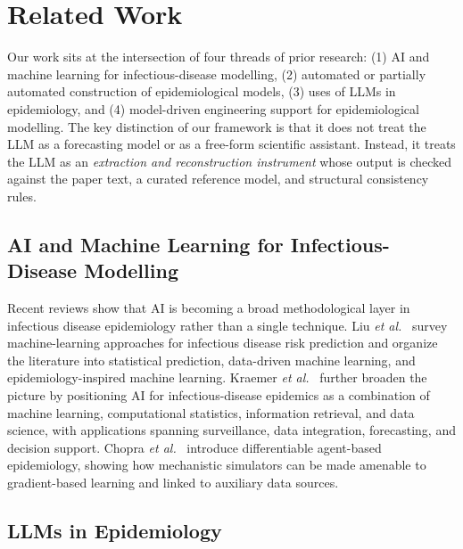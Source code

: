 \section{Related Work}
\label{sec:related}

Our work sits at the intersection of four threads of prior research: (1) AI and machine
learning for infectious-disease modelling, (2) automated or partially automated construction
of epidemiological models, (3) uses of LLMs in epidemiology, and (4) model-driven
engineering support for epidemiological modelling. The key distinction of our framework is
that it does not treat the LLM as a forecasting model or as a free-form scientific assistant.
Instead, it treats the LLM as an \emph{extraction and reconstruction instrument} whose output is checked against the paper text, a curated reference model, and structural consistency rules.

\subsection{AI and Machine Learning for Infectious-Disease Modelling}

Recent reviews show that AI is becoming a broad methodological layer in infectious disease epidemiology rather than a single technique. Liu \emph{et al.}~\cite{liu2023machinelearninginfectiousdisease} survey machine-learning approaches for infectious disease risk prediction and organize the literature into statistical prediction, data-driven machine learning, and epidemiology-inspired machine learning. Kraemer \emph{et al.}~\cite{Kraemer2025AI_epidemics} further broaden the picture by positioning AI for infectious-disease epidemics as a combination of machine learning, computational statistics, information retrieval, and data science, with applications spanning surveillance, data integration, forecasting, and decision support. Chopra \emph{et al.}~\cite{chopra2023differentiableagentbasedepidemiology} introduce differentiable agent-based epidemiology, showing how mechanistic simulators can be made amenable to gradient-based learning and linked to auxiliary data sources.

\subsection{LLMs in Epidemiology}

